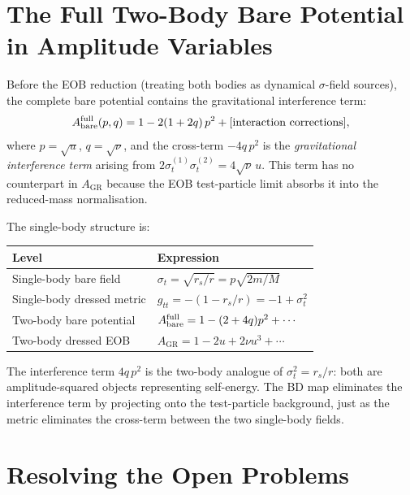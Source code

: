 \documentclass[11pt,a4paper]{article}
\theoremstyle{plain}
\theoremstyle{definition}
\theoremstyle{remark}
\newcommand{\sigt}{\sigma_t}
\newcommand{\GR}{\mathrm{GR}}
\newcommand{\bare}{\mathrm{bare}}
\begin{document}
\section{The Full Two-Body Bare Potential in Amplitude Variables}
\label{sec:full_bare}

Before the EOB reduction (treating both bodies as dynamical $\sigma$-field sources),
the complete bare potential contains the gravitational interference term:
\begin{equation}
  A_\bare^{\rm full}(p,q)
  = 1 - 2(1+2q)\,p^2 + [\text{interaction corrections}],
  \label{eq:A_bare_full}
\end{equation}
where $p = \sqrt{u}$, $q = \sqrt{\nu}$, and the cross-term $-4q\,p^2$ is the
\emph{gravitational interference term} arising from $2\sigt^{(1)}\sigt^{(2)} = 4\sqrt{\nu}\,u$.
This term has no counterpart in $A_\GR$ because the EOB test-particle limit
absorbs it into the reduced-mass normalisation.

The single-body structure is:
\begin{center}
\renewcommand{\arraystretch}{1.35}
\begin{tabular}{ll}
\toprule
Level & Expression \\
\midrule
Single-body bare field & $\sigt = \sqrt{r_s/r} = p\sqrt{2m/M}$ \\
Single-body dressed metric & $g_{tt} = -(1-r_s/r) = -1+\sigt^2$ \\
Two-body bare potential & $A_\bare^{\rm full} = 1-(2+4q)p^2 + \cdots$ \\
Two-body dressed EOB & $A_\GR = 1-2u+2\nu u^3 + \cdots$ \\
\bottomrule
\end{tabular}
\end{center}

The interference term $4q\,p^2$ is the two-body analogue of $\sigt^2 = r_s/r$: both are
amplitude-squared objects representing self-energy.  The BD map eliminates the interference
term by projecting onto the test-particle background, just as the metric eliminates the
cross-term between the two single-body fields.

\section{Resolving the Open Problems}
\label{sec:open_problems}
\end{document}
